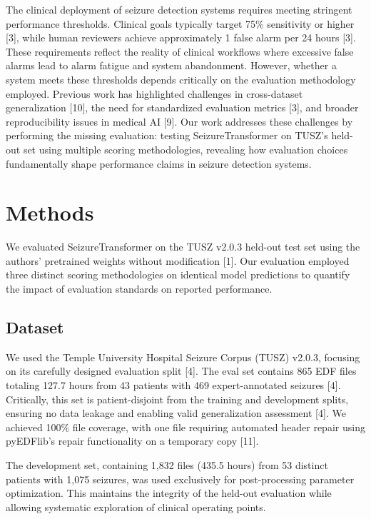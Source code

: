 The clinical deployment of seizure detection systems requires meeting
stringent performance thresholds. Clinical goals typically target 75\%
sensitivity or higher {[}3{]}, while human reviewers achieve
approximately 1 false alarm per 24 hours {[}3{]}. These requirements
reflect the reality of clinical workflows where excessive false alarms
lead to alarm fatigue and system abandonment. However, whether a system
meets these thresholds depends critically on the evaluation methodology
employed. Previous work has highlighted challenges in cross-dataset
generalization {[}10{]}, the need for standardized evaluation metrics
{[}3{]}, and broader reproducibility issues in medical AI {[}9{]}. Our
work addresses these challenges by performing the missing evaluation:
testing SeizureTransformer on TUSZ's held-out set using multiple scoring
methodologies, revealing how evaluation choices fundamentally shape
performance claims in seizure detection systems.

\hypertarget{methods}{%
\section{Methods}\label{methods}}

We evaluated SeizureTransformer on the TUSZ v2.0.3 held-out test set
using the authors' pretrained weights without modification {[}1{]}. Our
evaluation employed three distinct scoring methodologies on identical
model predictions to quantify the impact of evaluation standards on
reported performance.

\hypertarget{dataset}{%
\subsection{Dataset}\label{dataset}}

We used the Temple University Hospital Seizure Corpus (TUSZ) v2.0.3,
focusing on its carefully designed evaluation split {[}4{]}. The eval
set contains 865 EDF files totaling 127.7 hours from 43 patients with
469 expert-annotated seizures {[}4{]}. Critically, this set is
patient-disjoint from the training and development splits, ensuring no
data leakage and enabling valid generalization assessment {[}4{]}. We
achieved 100\% file coverage, with one file requiring automated header
repair using pyEDFlib's repair functionality on a temporary copy
{[}11{]}.

The development set, containing 1,832 files (435.5 hours) from 53
distinct patients with 1,075 seizures, was used exclusively for
post-processing parameter optimization. This maintains the integrity of
the held-out evaluation while allowing systematic exploration of
clinical operating points.

